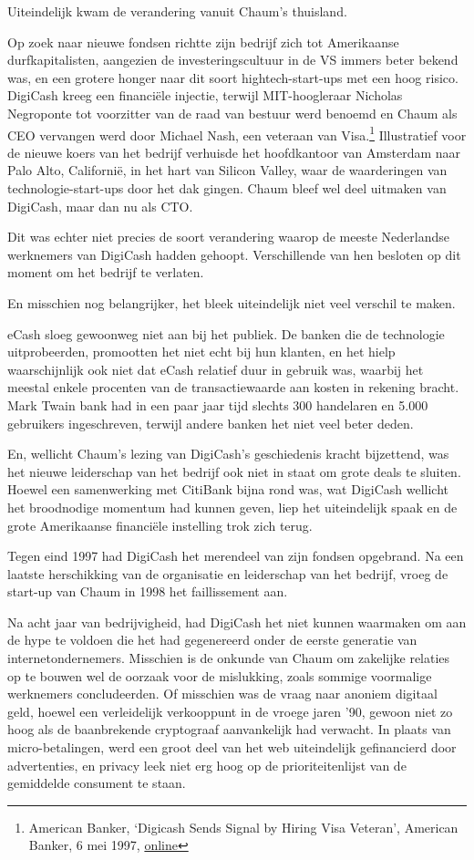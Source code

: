 \documentclass[
  a5paper,
  smalldemyvopaper,11pt,twoside,onecolumn,openright,extrafontsizes]{memoir}
\begin{document}
Uiteindelijk kwam de verandering vanuit Chaum's thuisland.

Op zoek naar nieuwe fondsen richtte zijn bedrijf zich tot Amerikaanse
durfkapitalisten, aangezien de investeringscultuur in de VS immers beter
bekend was, en een grotere honger naar dit soort hightech-start-ups met
een hoog risico. DigiCash kreeg een financiële injectie, terwijl
MIT-hoogleraar Nicholas Negroponte tot voorzitter van de raad van
bestuur werd benoemd en Chaum als CEO vervangen werd door Michael Nash,
een veteraan van Visa.\footnote{American Banker, `Digicash Sends Signal
  by Hiring Visa Veteran', American Banker, 6 mei 1997,
  \href{https://www.americanbanker.com/news/digicash-sends-signal-by-hiring-visa-veteran}{online}}
Illustratief voor de nieuwe koers van het bedrijf verhuisde het
hoofdkantoor van Amsterdam naar Palo Alto, Californië, in het hart van
Silicon Valley, waar de waarderingen van technologie-start-ups door het
dak gingen. Chaum bleef wel deel uitmaken van DigiCash, maar dan nu als
CTO.

Dit was echter niet precies de soort verandering waarop de meeste
Nederlandse werknemers van DigiCash hadden gehoopt. Verschillende van
hen besloten op dit moment om het bedrijf te verlaten.

En misschien nog belangrijker, het bleek uiteindelijk niet veel verschil
te maken.

eCash sloeg gewoonweg niet aan bij het publiek. De banken die de
technologie uitprobeerden, promootten het niet echt bij hun klanten, en
het hielp waarschijnlijk ook niet dat eCash relatief duur in gebruik
was, waarbij het meestal enkele procenten van de transactiewaarde aan
kosten in rekening bracht. Mark Twain bank had in een paar jaar tijd
slechts 300 handelaren en 5.000 gebruikers ingeschreven, terwijl andere
banken het niet veel beter deden.

En, wellicht Chaum's lezing van DigiCash's geschiedenis kracht
bijzettend, was het nieuwe leiderschap van het bedrijf ook niet in staat
om grote deals te sluiten. Hoewel een samenwerking met CitiBank bijna
rond was, wat DigiCash wellicht het broodnodige momentum had kunnen
geven, liep het uiteindelijk spaak en de grote Amerikaanse financiële
instelling trok zich terug.

Tegen eind 1997 had DigiCash het merendeel van zijn fondsen opgebrand.
Na een laatste herschikking van de organisatie en leiderschap van het
bedrijf, vroeg de start-up van Chaum in 1998 het faillissement aan.

Na acht jaar van bedrijvigheid, had DigiCash het niet kunnen waarmaken
om aan de hype te voldoen die het had gegenereerd onder de eerste
generatie van internetondernemers. Misschien is de onkunde van Chaum om
zakelijke relaties op te bouwen wel de oorzaak voor de mislukking, zoals
sommige voormalige werknemers concludeerden. Of misschien was de vraag
naar anoniem digitaal geld, hoewel een verleidelijk verkooppunt in de
vroege jaren '90, gewoon niet zo hoog als de baanbrekende cryptograaf
aanvankelijk had verwacht. In plaats van micro-betalingen, werd een
groot deel van het web uiteindelijk gefinancierd door advertenties, en
privacy leek niet erg hoog op de prioriteitenlijst van de gemiddelde
consument te staan.
\end{document}
